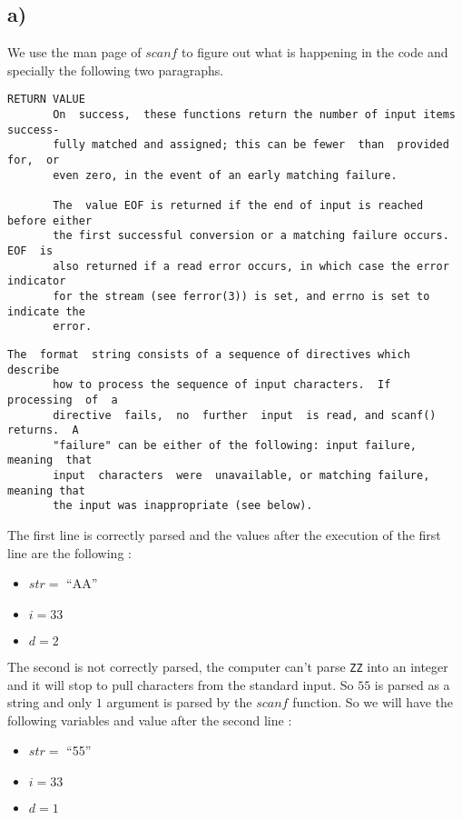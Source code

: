\documentclass[a4paper,11pt]{report}
\begin{document}
\subsection*{a)}

We use the man page of $scanf$ to figure out what is happening in the code and
specially the following two paragraphs.

\begin{verbatim}
RETURN VALUE
       On  success,  these functions return the number of input items success‐
       fully matched and assigned; this can be fewer  than  provided  for,  or
       even zero, in the event of an early matching failure.

       The  value EOF is returned if the end of input is reached before either
       the first successful conversion or a matching failure occurs.   EOF  is
       also returned if a read error occurs, in which case the error indicator
       for the stream (see ferror(3)) is set, and errno is set to indicate the
       error.
\end{verbatim}

\begin{verbatim}
The  format  string consists of a sequence of directives which describe
       how to process the sequence of input characters.  If  processing  of  a
       directive  fails,  no  further  input  is read, and scanf() returns.  A
       "failure" can be either of the following: input failure,  meaning  that
       input  characters  were  unavailable, or matching failure, meaning that
       the input was inappropriate (see below).
\end{verbatim}

The first line is correctly parsed and the values after the execution of the
first line are the following :

\begin{itemize}
\item $str =$ ``AA''
\item $i = 33$
\item $d = 2$
\end{itemize}

The second is not correctly parsed, the computer can't parse \verb+ZZ+ into an
integer and it will stop to pull characters from the standard input. So $55$ is
parsed as a string and only $1$ argument is parsed by the $scanf$ function. So
we will have the following variables and value after the second line :

\begin{itemize}
\item $str =$ ``55''
\item $i = 33$
\item $d = 1$
\end{itemize}
\end{document}
